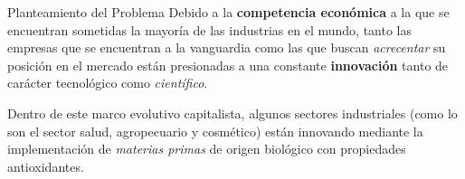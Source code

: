\begin{frame}[t]{Planteamiento del Problema}\vspace{10pt}
Debido a la \textbf{competencia econ\'omica} a la que se encuentran sometidas la mayor\'ia de las industrias en el mundo, tanto las empresas que se encuentran a la vanguardia como las que buscan \textit{acrecentar} su posici\'on en el mercado est\'an presionadas a una constante \textbf{innovaci\'on} tanto de car\'acter tecnol\'ogico como \textit{cient\'ifico}. 

\vspace{1cm}

Dentro de este marco evolutivo capitalista, algunos sectores industriales (como lo son el sector salud, agropecuario y cosm\'etico) est\'an innovando mediante la implementaci\'on de \textit{materias primas} de origen biol\'ogico con propiedades antioxidantes.
\end{frame}